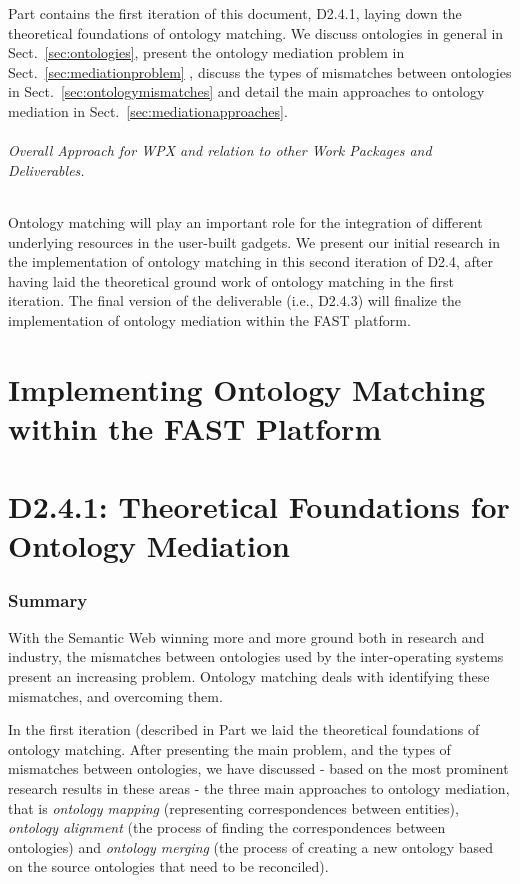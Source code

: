 \documentclass{fast_latex}
\begin{document}
Part \ref{part:d2.4.1} contains the first iteration of this document, D2.4.1, laying down the theoretical foundations of ontology matching. We discuss ontologies in general in Sect.~\ref{sec:ontologies}, present the ontology mediation problem in Sect.~\ref{sec:mediationproblem} , discuss the types  of mismatches between ontologies in Sect.~\ref{sec:ontologymismatches} and detail the main approaches to ontology mediation in Sect.~\ref{sec:mediationapproaches}.

\paragraph{Overall Approach for WPX and relation to other Work Packages and Deliverables.}
Ontology matching will play an important role for the integration of different underlying resources in the user-built gadgets. 
We present our initial research in the implementation of ontology matching in this second iteration of D2.4, after having laid the theoretical ground work of ontology matching in the first iteration. The final version of the deliverable (i.e., D2.4.3) will finalize the implementation of ontology mediation within the FAST platform. 


\part{Implementing Ontology Matching within the FAST Platform}
\label{part:d2.4.2}



\part{D2.4.1: Theoretical Foundations for Ontology Mediation}
\label{part:d2.4.1}


\section{Summary}
\label{sec:summary}
With the Semantic Web winning more and more ground both in research and industry, the mismatches between ontologies used by the inter-operating systems present an increasing problem. Ontology matching deals with identifying these mismatches, and overcoming them. 

In the first iteration (described in Part \ref{part:d2.4.1} we laid the theoretical foundations of ontology matching. After presenting the main problem, and the types of mismatches between ontologies, we have discussed - based on the most prominent research results in these areas - the three main approaches to ontology mediation, that is \textit{ontology mapping} (representing  correspondences between entities), \textit{ontology alignment} (the process of finding the correspondences between ontologies) and \textit{ontology merging }(the process of creating a new ontology based
on the source ontologies that need to be reconciled). 
\end{document}
